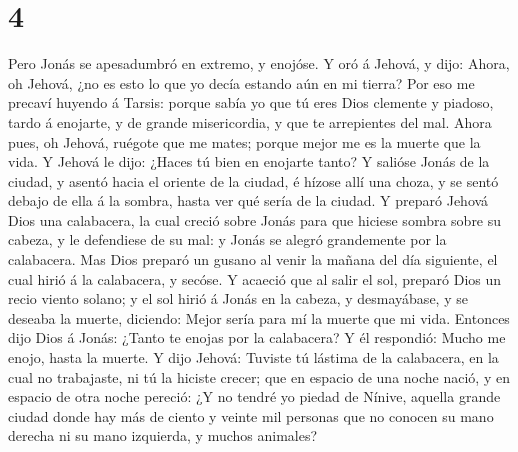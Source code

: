 \hypertarget{section-3}{%
\section{4}\label{section-3}}

 Pero Jonás se apesadumbró en extremo, y enojóse.
 Y oró á Jehová, y dijo: Ahora, oh Jehová, ¿no es esto lo
que yo decía estando aún en mi tierra? Por eso me precaví huyendo á
Tarsis: porque sabía yo que tú eres Dios clemente y piadoso, tardo á
enojarte, y de grande misericordia, y que te arrepientes del mal.
 Ahora pues, oh Jehová, ruégote que me mates; porque mejor
me es la muerte que la vida.  Y Jehová le dijo: ¿Haces tú
bien en enojarte tanto?  Y salióse Jonás de la ciudad, y
asentó hacia el oriente de la ciudad, é hízose allí una choza, y se
sentó debajo de ella á la sombra, hasta ver qué sería de la ciudad.
 Y preparó Jehová Dios una calabacera, la cual creció sobre
Jonás para que hiciese sombra sobre su cabeza, y le defendiese de su
mal: y Jonás se alegró grandemente por la calabacera.  Mas
Dios preparó un gusano al venir la mañana del día siguiente, el cual
hirió á la calabacera, y secóse.  Y acaeció que al salir el
sol, preparó Dios un recio viento solano; y el sol hirió á Jonás en la
cabeza, y desmayábase, y se deseaba la muerte, diciendo: Mejor sería
para mí la muerte que mi vida.  Entonces dijo Dios á Jonás:
¿Tanto te enojas por la calabacera? Y él respondió: Mucho me enojo,
hasta la muerte.  Y dijo Jehová: Tuviste tú lástima de la
calabacera, en la cual no trabajaste, ni tú la hiciste crecer; que en
espacio de una noche nació, y en espacio de otra noche pereció:
 ¿Y no tendré yo piedad de Nínive, aquella grande ciudad
donde hay más de ciento y veinte mil personas que no conocen su mano
derecha ni su mano izquierda, y muchos animales?
